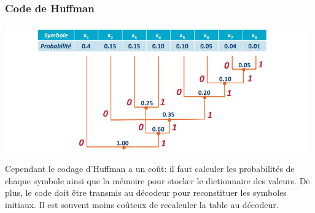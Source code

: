 \documentclass[a4paper,12pt,oneside]{report}	%
\begin{document}
            \subsubsection{Code de Huffman}
                \begin{center}
                    \includegraphics[width=13cm]{LaTeX/pictures/1.1.2_1.png}
                \end{center}
                Cependant le codage d'Huffman a un \colorbox{bright-red}{coût}: il faut calculer les probabilités de chaque symbole ainsi que la mémoire pour stocker le dictionnaire des valeurs. De plus, le code doit être transmis au décodeur pour reconstituer les symboles initiaux. Il est souvent moins coûteux de recalculer la table au décodeur.
\end{document}
